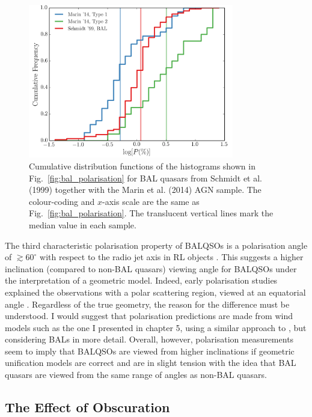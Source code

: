 \begin{figure}
\centering
\includegraphics[width=0.8\textwidth]{figures/ewpaper/cdf_p.png}
\caption
{
Cumulative distribution functions of the histograms shown in
Fig.~\ref{fig:bal_polarisation} for BAL quasars from Schmidt et al. (1999) 
together with the Marin et al. (2014) AGN sample. The colour-coding and 
$x$-axis scale are the same as Fig.~\ref{fig:bal_polarisation}. 
The translucent vertical lines mark the median value in each sample.
}
\label{fig:cdf_pol}
\end{figure}

The third characteristic polarisation property of BALQSOs 
is a polarisation angle of $\gtrsim60^\circ$ with respect
to the radio jet axis in RL objects \citep[][and references therein]{brotherton2006}.
This suggests a higher inclination (compared to non-BAL quasars)
viewing angle for BALQSOs under the interpretation of a geometric model. Indeed,
early polarisation studies explained the observations with a polar scattering region,
viewed at an equatorial angle 
\citep[e.g.][]{goodrich1995, cohen1995,lamy2004}. Regardless of
the true geometry, the reason for the difference must be understood.
I would suggest that polarisation predictions are made from wind
models such as the one I presented in chapter 5, using a similar
approach to \cite{marin2013}, but considering BALs in more detail. 
Overall, however, polarisation measurements seem to imply that BALQSOs are viewed
from higher inclinations if geometric unification models are correct and are 
in slight tension with the idea that BAL quasars are viewed from the same range
of angles as non-BAL quasars.

\subsection{The Effect of Obscuration}
\label{sec:obscure}

